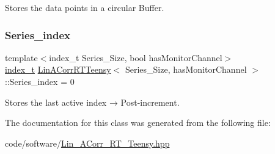 Stores the data points in a circular Buffer. 

\mbox{\label{classLinACorrRTTeensy_abe0523ada55375281deacb143b6055b7}} 
\subsubsection{\texorpdfstring{Series\+\_\+index}{Series\_index}}
{\footnotesize\ttfamily template$<$index\+\_\+t Series\+\_\+\+Size, bool has\+Monitor\+Channel$>$ \\
\hyperlink{types_8hpp_a7c40bb931c31595ed6308605f4537447}{index\+\_\+t} \hyperlink{classLinACorrRTTeensy}{Lin\+A\+Corr\+R\+T\+Teensy}$<$ Series\+\_\+\+Size, has\+Monitor\+Channel $>$\+::Series\+\_\+index = 0}



Stores the last active index → Post-\/increment. 



The documentation for this class was generated from the following file\+:\begin{DoxyCompactItemize}
\item 
code/software/\hyperlink{Lin__ACorr__RT__Teensy_8hpp}{Lin\+\_\+\+A\+Corr\+\_\+\+R\+T\+\_\+\+Teensy.\+hpp}\end{DoxyCompactItemize}
